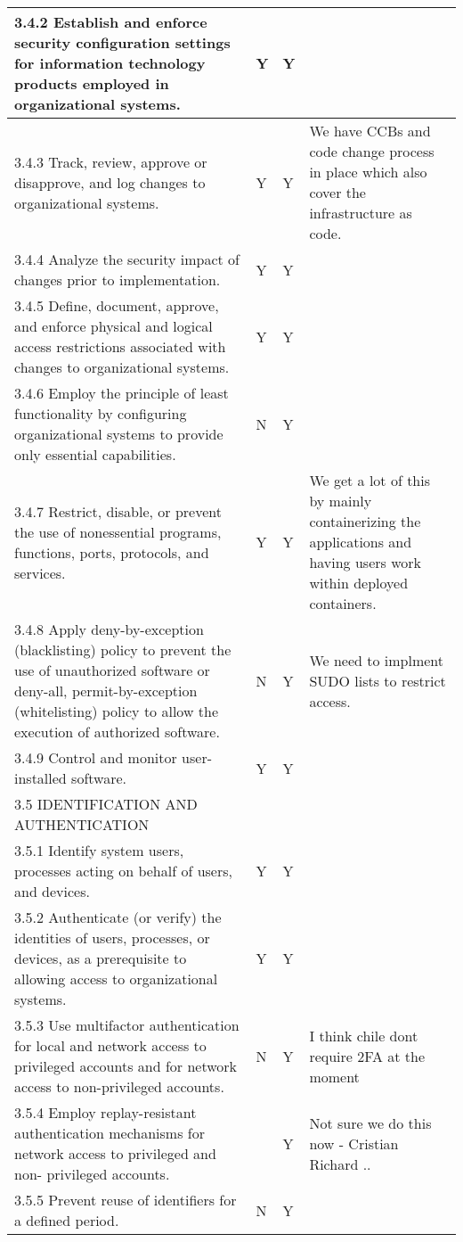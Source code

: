 \begin{longtable} {|p{}|p{}|p{}|p{} |}
{3.4.2 Establish and enforce security configuration settings for information technology products employed in organizational systems.}&{Y}&{Y}& \\ \hline
{3.4.3 Track, review, approve or disapprove, and log changes to organizational systems.}&{Y}&{Y}&{We have CCBs and code change process in place which also cover the infrastructure as code. } \\ \hline
{3.4.4 Analyze the security impact of changes prior to implementation.}&{Y}&{Y}& \\ \hline
{3.4.5 Define, document, approve, and enforce physical and logical access restrictions associated with changes to organizational systems.}&{Y}&{Y}& \\ \hline
{3.4.6 Employ the principle of least functionality by configuring organizational systems to provide only essential capabilities.}&{N}&{Y}& \\ \hline
{3.4.7 Restrict, disable, or prevent the use of nonessential programs, functions, ports, protocols, and services.}&{Y}&{Y}&{We get a lot of this by mainly containerizing the applications and having users work within deployed containers.} \\ \hline
{3.4.8 Apply deny-by-exception (blacklisting) policy to prevent the use of unauthorized software or deny-all, permit-by-exception (whitelisting) policy to allow the execution of authorized software.}&{N}&{Y}&{We need to implment SUDO lists to restrict access.} \\ \hline
{3.4.9 Control and monitor user-installed software.}&{Y}&{Y}& \\ \hline
{3.5 IDENTIFICATION AND AUTHENTICATION}&&& \\ \hline
{3.5.1 Identify system users, processes acting on behalf of users, and devices.}&{Y}&{Y}& \\ \hline
{3.5.2 Authenticate (or verify) the identities of users, processes, or devices, as a prerequisite to allowing access to organizational systems.}&{Y}&{Y}& \\ \hline
{3.5.3 Use multifactor authentication for local and network access to privileged accounts and for network access to non-privileged accounts.}&{N}&{Y}&{ I think chile dont require 2FA at the moment} \\ \hline
{3.5.4 Employ replay-resistant authentication mechanisms for network access to privileged and non- privileged accounts.}&{}&{Y}&{Not sure we do this now - Cristian Richard ..} \\ \hline
{3.5.5 Prevent reuse of identifiers for a defined period.}&{N}&{Y}& \\ \hline

\end{longtable}
